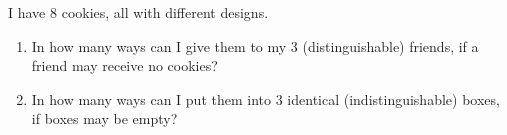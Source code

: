 I have $8$ cookies, all with different designs.
\begin{enumerate}
\item[(a)] In how many ways can I give them to my $3$ (distinguishable) friends, if a friend may receive no cookies?
\item[(b)] In how many ways can I put them into $3$ identical (indistinguishable) boxes, if boxes may be empty?
\end{enumerate}
